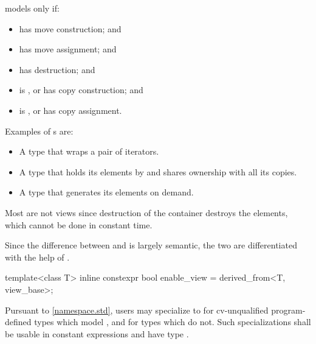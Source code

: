 \begin{itemdescr}
\pnum
{} models  only if:
\begin{itemize}
\item
{} has  move construction; and

\item
{} has  move assignment; and

\item
{} has  destruction; and

\item
{} is , or
 has  copy construction; and

\item
{} is , or
 has  copy assignment.
\end{itemize}

\pnum
\begin{example}
Examples of s are:
\begin{itemize}
\item A  type that wraps a pair of iterators.

\item A  type that holds its elements by 
and shares ownership with all its copies.

\item A  type that generates its elements on demand.
\end{itemize}

Most  are not views since
destruction of the container destroys the elements,
which cannot be done in constant time.
\end{example}
\end{itemdescr}

\pnum
Since the difference between  and  is largely
semantic, the two are differentiated with the help of .

%
\begin{itemdecl}
template<class T>
  inline constexpr bool enable_view = derived_from<T, view_base>;
\end{itemdecl}

\begin{itemdescr}
\pnum
\remarks
Pursuant to \ref{namespace.std}, users may specialize 
to 
for cv-unqualified program-defined types which model ,
and  for types which do not.
Such specializations shall
be usable in constant expressions and
have type .
\end{itemdescr}

